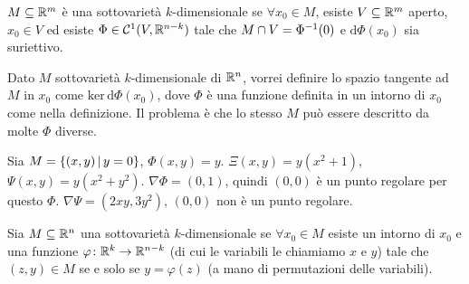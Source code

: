 \documentclass[a4paper]{article}
\begin{document}
\begin{snippetdefinition}{}
    \(M \subseteq \mathbb{R}^m\) è una sottovarietà \(k\)-dimensionale
    se \(\forall x_0 \in M\), esiste \(V \subseteq \mathbb{R}^m\) aperto, \(x_0 \in V\)
    ed esiste \(\Phi \in \mathcal{C}^1(V, \mathbb{R}^{n-k})\) tale che
    \(M \cap V = \Phi^{-1}(0)\) e \(\text{d}\Phi(x_0)\) sia suriettivo.
\end{snippetdefinition}

Dato \(M\) sottovarietà \(k\)-dimensionale
di \(\mathbb{R}^n\), vorrei definire lo spazio tangente ad \(M\)
in \(x_0\) come \(\text{ker}\,\text{d}\Phi(x_0)\), dove \(\Phi\) è
una funzione definita in un intorno di \(x_0\) come nella definizione.
Il problema è che lo stesso \(M\) può essere descritto da molte \(\Phi\) diverse.

\begin{snippetexample}{}
    Sia \(M = \{(x,y) \,|\, y=0\}\), \(\Phi(x,y) = y\).
    \(\Xi(x,y) = y(x^2 + 1)\), \(\Psi(x,y) = y(x^2 + y^2)\).
    \(\nabla \Phi = (0,1)\), quindi \((0,0)\) è un punto regolare per questo \(\Phi\).
    \(\nabla \Psi = (2xy, 3y^2)\), \((0,0)\) non è un punto regolare.
\end{snippetexample}

\begin{snippetdefinition}{}
    Sia \(M \subseteq \mathbb{R}^n\) una sottovarietà \(k\)-dimensionale
    se \(\forall x_0 \in M\) esiste un intorno di \(x_0\) e una funzione
    \(\varphi \colon \mathbb{R}^k \to \mathbb{R}^{n-k}\) (di cui le variabili
    le chiamiamo \(x\) e \(y\)) tale che \((z,y) \in M\) se e solo se \(y = \varphi(z)\)
    (a mano di permutazioni delle variabili).
\end{snippetdefinition}
\end{document}
